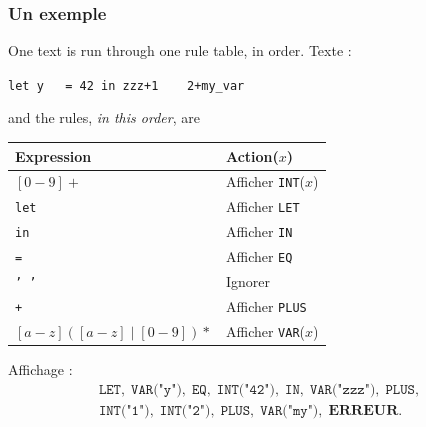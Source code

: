 \subsubsection{Un exemple}
One text is run through one rule table, in order. Texte :
\begin{center}
  \texttt{let y\ \ \ = 42 in zzz+1\ \ \ \ 2+my\_var}
\end{center}
and the rules, \emph{in this order}, are

\begin{center}
  \begin{tabular}{@{}ll@{}}
    \toprule
    Expression & Action($x$) \\
    \midrule
    $[0-9]{+}$                        & Afficher \texttt{INT}($x$) \\
    \texttt{let}                      & Afficher \texttt{LET} \\
    \texttt{in}                       & Afficher \texttt{IN} \\
    \texttt{=}                        & Afficher \texttt{EQ} \\
    \texttt{'\ '}                     & Ignorer \\
    \texttt{+}                        & Afficher \texttt{PLUS} \\
    $[a-z]([a-z] \mid [0-9]){*}$      & Afficher \texttt{VAR}($x$) \\
    \bottomrule
  \end{tabular}
\end{center}

\noindent
Affichage :
\[
  \begin{array}{l}
    \texttt{LET},\;
    \texttt{VAR("y")},\;
    \texttt{EQ},\;
    \texttt{INT("42")},\;
    \texttt{IN},\;
    \texttt{VAR("zzz")},\;
    \texttt{PLUS}, \\[2pt]
    \texttt{INT("1")},\;
    \texttt{INT("2")},\;
    \texttt{PLUS},\;
    \texttt{VAR("my")},\;
    \textbf{ERREUR}.
  \end{array}
\]

